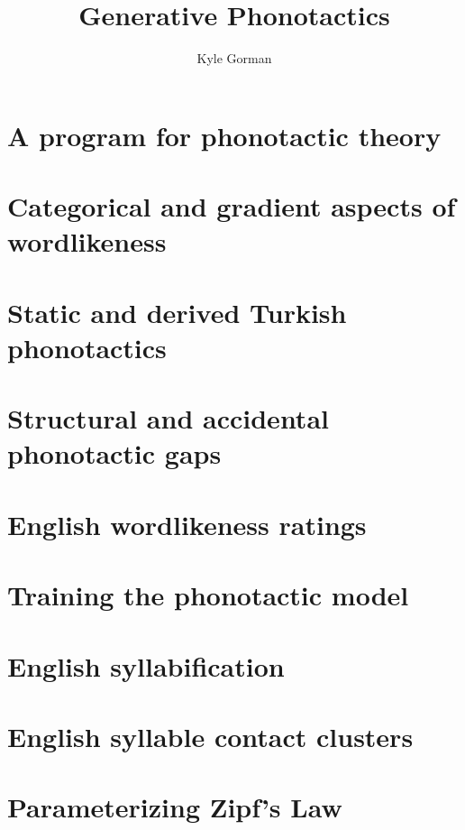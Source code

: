 \documentclass[draft]{upenndiss}
\title{Generative Phonotactics}
\author{Kyle Gorman}
\begin{document}
\FrontMatter

\chapter{A program for phonotactic theory}

\chapter{Categorical and gradient aspects of wordlikeness}

\chapter{Static and derived Turkish phonotactics} 

\chapter{Structural and accidental phonotactic gaps} 


\appendix 
\renewcommand{\arraystretch}{0.25}

\chapter{English wordlikeness ratings} 
\chapter{Training the \citeauthor{Hayes2008a} phonotactic model} 
\chapter{English syllabification} 
\chapter{English syllable contact clusters} 
\chapter{Parameterizing Zipf's Law} 



\end{document}
